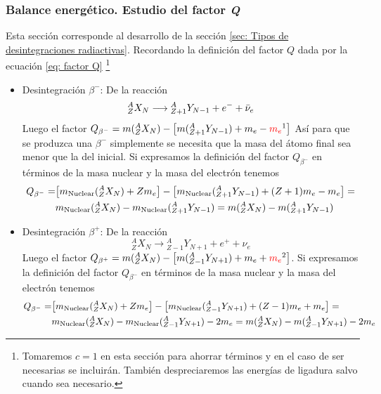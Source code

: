 \subsubsection{Balance energético. Estudio del factor \textit{Q}}
Esta sección corresponde al desarrollo de la sección \ref{sec: Tipos de desintegraciones radiactivas}. Recordando la definición del factor $Q$ dada por la ecuación \ref{eq: factor Q} \footnote{Tomaremos $c=1$ en esta sección para ahorrar términos y en el caso de ser necesarias se incluirán. También despreciaremos las energías de ligadura salvo cuando sea necesario.}
\begin{itemize}
    \item Desintegración $\beta^-$: De la reacción 
      \begin{equation*}
        ^A _Z X_N \longrightarrow {}^{A} _{Z+1} Y_{N-1}+e^-+\Bar{\nu}_e
        \end{equation*}
    Luego el factor $Q_{\beta^-}=m(^{A} _{Z}X_N )-\qty[ m({}^{A} _{Z+1} Y_{N-1})+ m_e- \textcolor{red}{m_e}\footnotemark ]$ Así para que se produzca una $\beta^-$ simplemente se necesita que la masa del átomo final sea menor que la del inicial. Si expresamos la definición del factor $Q_{\beta^-}$ en términos de la masa nuclear y la masa del electrón tenemos 
    \begin{equation*}
        \begin{aligned}
            Q_{\beta^-}=&\qty[m_\mathrm{Nuclear}({}^A_Z X_N)+Zm_e]-\qty[m_\mathrm{Nuclear}({}^A_{Z+1} Y_{N-1})+(Z+1)m_e-m_e]=\\ &m_\mathrm{Nuclear}({}^A_Z X_N)-m_\mathrm{Nuclear}({}^A_{Z+1} Y_{N-1})=m({}^A_Z X_N)-m({}^A_{Z+1} Y_{N-1})
        \end{aligned}
    \end{equation*}
    \item Desintegración $\beta^+$: De la reacción
          \begin{equation*}
        ^A _Z X_N \longrightarrow {}^{A} _{Z-1} Y_{N+1}+e^++\nu_e
        \end{equation*}
    Luego el factor $Q_{\beta^+}=m(^{A} _{Z}X_N )-\qty[ m({}^{A} _{Z-1} Y_{N+1})+ m_e+ \textcolor{red}{m_e}\footnotemark ]$. Si expresamos la definición del factor $Q_{\beta^-}$ en términos de la masa nuclear y la masa del electrón tenemos 
    \begin{equation*}
        \begin{aligned}
            Q_{\beta^-}=&\qty[m_\mathrm{Nuclear}({}^A_Z X_N)+Zm_e]-\qty[m_\mathrm{Nuclear}({}^A_{Z-1} Y_{N+1})+(Z-1)m_e+m_e]=\\ &m_\mathrm{Nuclear}({}^A_Z X_N)-m_\mathrm{Nuclear}({}^A_{Z-1} Y_{N+1})-2m_e= m({}^A_Z X_N)-m({}^A_{Z-1} Y_{N+1})-2m_e

\end{aligned}
\end{equation*}
\end{itemize}
